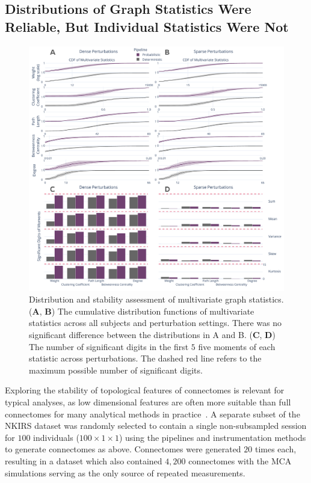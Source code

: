 \documentclass[fleqn,10pt]{SelfArx} %
\newcommand{\new}[1]{{\color{blue} #1}}
\begin{document}
\subsection*{Distributions of Graph Statistics \new{Were} Reliable, But Individual Statistics \new{Were} Not}
\begin{figure}[bht!]\centering
\includegraphics[width=\linewidth]{figures/fig2_multivariate_differences.pdf}
\caption{Distribution and stability assessment of multivariate graph statistics. (\textbf{A}, \textbf{B}) The
cumulative distribution functions of multivariate statistics across all subjects and perturbation settings. There was
no significant difference between the distributions in A and B. (\textbf{C}, \textbf{D}) The number of significant
digits in the first $5$ five moments of each statistic across perturbations. The dashed red line refers to the maximum
possible number of significant digits.}
\label{fig:multivar}
\end{figure}

Exploring the stability of topological features of connectomes is relevant for typical analyses, as low dimensional
features are often more suitable than full connectomes for many analytical methods in practice~\cite{Rubinov2010-fh}.
A separate subset of the NKIRS dataset was randomly selected to contain a single non-subsampled session for $100$
individuals \new{($100 \times 1 \times 1$) using the pipelines and instrumentation methods to generate connectomes as
above. Connectomes were generated $20$ times each, resulting in a dataset which also contained $4,200$ connectomes with
the MCA simulations serving as the only source of repeated measurements.}
\end{document}
